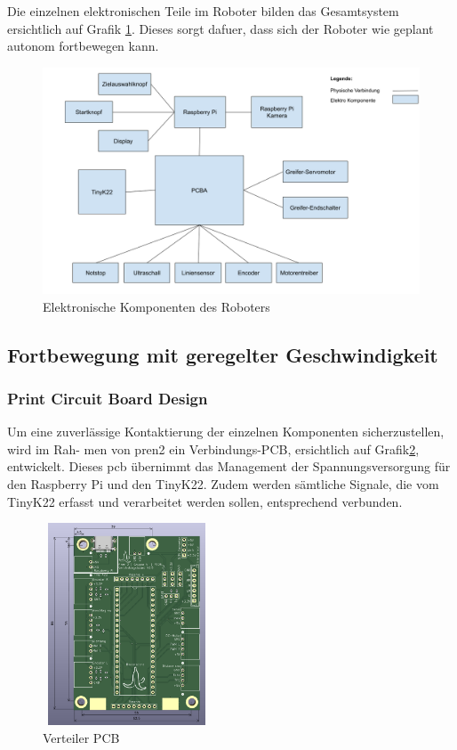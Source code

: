 Die einzelnen elektronischen Teile im Roboter bilden das Gesamtsystem ersichtlich auf Grafik \ref{fig:electro-components}. Dieses sorgt dafuer, dass sich der Roboter wie geplant autonom fortbewegen kann.

\begin{figure}[H]
\centering
\includegraphics[width=\textwidth]{assets/gesamtkonzept/electronics.png}
\caption{Elektronische Komponenten des Roboters}
\label{fig:electro-components}
\end{figure} 

\newpage

\subsection{Fortbewegung mit geregelter Geschwindigkeit}

\subsubsection{Print Circuit Board Design}
\label{pcb}

Um eine zuverlässige Kontaktierung der einzelnen Komponenten sicherzustellen, wird im Rah-
men von \acrshort{pren2} ein Verbindungs-PCB, ersichtlich auf Grafik\ref{fig: Verteiler PCB}, entwickelt. Dieses \acrshort{pcb} übernimmt das Management der
Spannungsversorgung für den Raspberry Pi und den TinyK22. Zudem werden sämtliche Signale,
die vom TinyK22 erfasst und verarbeitet werden sollen, entsprechend verbunden.

\begin{figure}[H]
\centering
\includegraphics[width=5cm, height=6cm]{assets/ET/PCB/VerteilerPCB_unbestueckt.png}
\caption{Verteiler PCB}
\label{fig: Verteiler PCB}
\end{figure}

